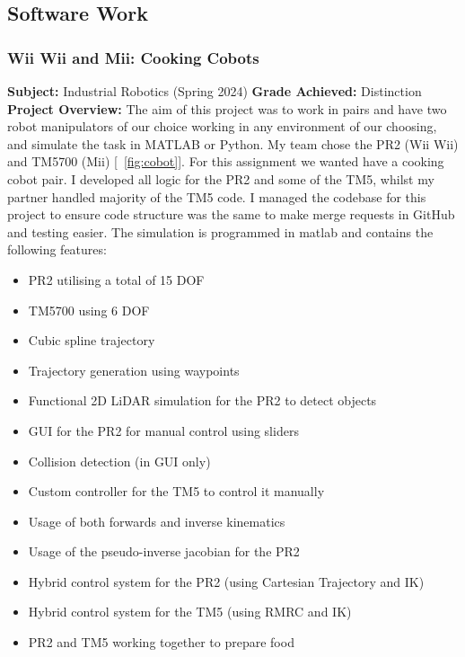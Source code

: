 \newpage
\subsection{Software Work}

\subsubsection{Wii Wii and Mii: Cooking Cobots}
\textbf{Subject: } Industrial Robotics (Spring 2024) \newline
\textbf{Grade Achieved: } Distinction \newline
\textbf{Project Overview: }
The aim of this project was to work in pairs and have two robot manipulators of our choice working in any environment of our choosing, and simulate the task in MATLAB or Python. My team chose the PR2 (Wii Wii) and TM5700 (Mii) [~\ref{fig:cobot}].
For this assignment we wanted have a cooking cobot pair. I developed all logic for the PR2 and some of the TM5, whilst my partner handled majority of the TM5 code. I managed the codebase for this project to ensure code structure was the same to 
make merge requests in GitHub and testing easier. The simulation is programmed in matlab and 
contains the following features:

\begin{itemize}
    \item PR2 utilising a total of 15 DOF
    \item TM5700 using 6 DOF
    \item Cubic spline trajectory
    \item Trajectory generation using waypoints
    \item Functional 2D LiDAR simulation for the PR2 to detect objects
    \item GUI for the PR2 for manual control using sliders
    \item Collision detection (in GUI only)
    \item Custom controller for the TM5 to control it manually
    \item Usage of both forwards and inverse kinematics 
    \item Usage of the pseudo-inverse jacobian for the PR2
    \item Hybrid control system for the PR2 (using Cartesian Trajectory and IK)
    \item Hybrid control system for the TM5 (using RMRC and IK)
    \item PR2 and TM5 working together to prepare food
\end{itemize}

